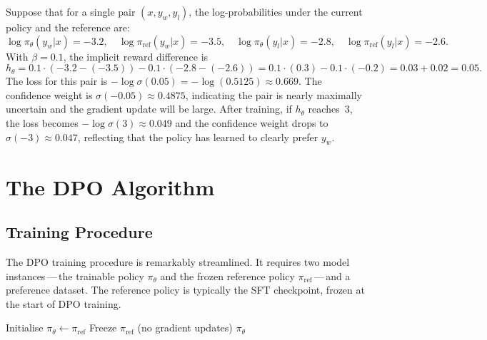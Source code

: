 \begin{example}
\label{ex:dpo-computation}
Suppose that for a single pair $(x, y_w, y_l)$, the log-probabilities under the current policy and the reference are:
\[
\log\pi_\theta(y_w|x) = -3.2, \quad \log\pi_\mathrm{ref}(y_w|x) = -3.5,
\quad \log\pi_\theta(y_l|x) = -2.8, \quad \log\pi_\mathrm{ref}(y_l|x) = -2.6.
\]
With $\beta = 0.1$, the implicit reward difference is
\[
h_\theta = 0.1\cdot(-3.2 - (-3.5)) - 0.1\cdot(-2.8 - (-2.6))
= 0.1\cdot(0.3) - 0.1\cdot(-0.2) = 0.03 + 0.02 = 0.05.
\]
The loss for this pair is $-\log\sigma(0.05) = -\log(0.5125) \approx 0.669$. The confidence weight is $\sigma(-0.05) \approx 0.4875$, indicating the pair is nearly maximally uncertain and the gradient update will be large. After training, if $h_\theta$ reaches~$3$, the loss becomes $-\log\sigma(3) \approx 0.049$ and the confidence weight drops to $\sigma(-3) \approx 0.047$, reflecting that the policy has learned to clearly prefer $y_w$.
\end{example}

\section{The DPO Algorithm}
\label{sec:dpo-algorithm}

\subsection{Training Procedure}

The DPO training procedure is remarkably streamlined. It requires two model instances\,---\,the trainable policy $\pi_\theta$ and the frozen reference policy $\pi_\mathrm{ref}$\,---\,and a preference dataset. The reference policy is typically the SFT checkpoint, frozen at the start of DPO training.

\begin{algorithm}[ht]
\caption{Direct Preference Optimisation (DPO)}
\label{alg:dpo}
Initialise $\pi_\theta \leftarrow \pi_\mathrm{ref}$\;
Freeze $\pi_\mathrm{ref}$ (no gradient updates)\;
\Return $\pi_\theta$
\end{algorithm}

